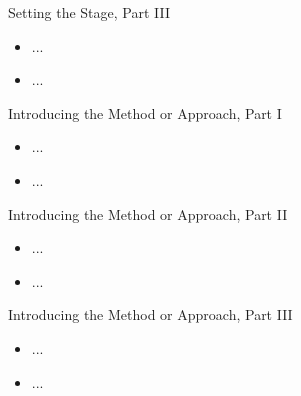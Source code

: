 \documentclass[12pt,t]{beamer}
\begin{document}

\begin{frame}[c]{Setting the Stage, Part III}

\begin{center}
\begin{itemize}
  \item ...
  \item ...
\end{itemize}
\end{center}

\note{
}

\end{frame}


\begin{frame}[c]{Introducing the Method or Approach, Part I}

\begin{center}
\begin{itemize}
  \item ...
  \item ...
\end{itemize}
\end{center}

\note{
}

\end{frame}


\begin{frame}[c]{Introducing the Method or Approach, Part II}

\begin{center}
\begin{itemize}
  \item ...
  \item ...
\end{itemize}
\end{center}

\note{
}

\end{frame}


\begin{frame}[c]{Introducing the Method or Approach, Part III}

\begin{center}
\begin{itemize}
  \item ...
  \item ...
\end{itemize}
\end{center}

\note{
}

\end{frame}
\end{document}
